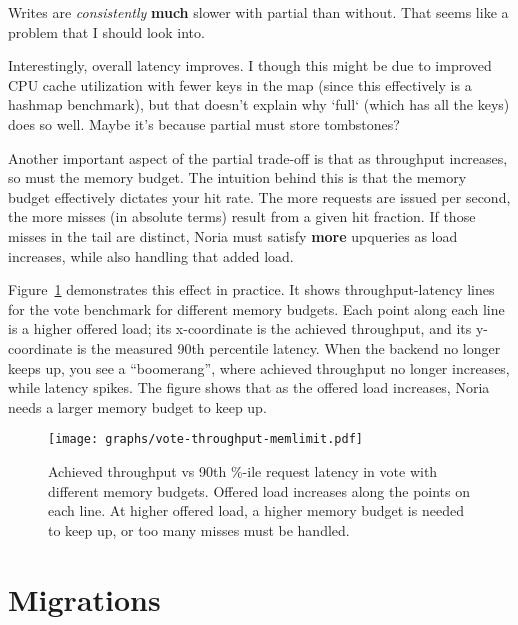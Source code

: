 \begin{inprogress}
  Writes are \textit{consistently} \textbf{much} slower with partial than
  without. That seems like a problem that I should look into.
\end{inprogress}

\begin{inprogress}
  Interestingly, overall latency improves. I though this might be due to
  improved CPU cache utilization with fewer keys in the map (since this
  effectively is a hashmap benchmark), but that doesn't explain why `full`
  (which has all the keys) does so well. Maybe it's because partial must store
  tombstones?
\end{inprogress}

Another important aspect of the partial trade-off is that as throughput
increases, so must the memory budget. The intuition behind this is that the
memory budget effectively dictates your hit rate. The more requests are issued
per second, the more misses (in absolute terms) result from a given hit
fraction. If those misses in the tail are distinct, Noria must satisfy
\textbf{more} upqueries as load increases, while also handling that added load.

Figure~\ref{f:vote-throughput-memlimit} demonstrates this effect in practice. It
shows throughput-latency lines for the vote benchmark for different memory
budgets. Each point along each line is a higher offered load; its x-coordinate
is the achieved throughput, and its y-coordinate is the measured 90th percentile
latency. When the backend no longer keeps up, you see a ``boomerang'', where
achieved throughput no longer increases, while latency spikes. The figure shows
that as the offered load increases, Noria needs a larger memory budget to keep
up.

\begin{figure}[ht]
  \centering
  \texttt{[image: graphs/vote-throughput-memlimit.pdf]}
  \caption{Achieved throughput vs 90th \%-ile request latency in vote with
  different memory budgets. Offered load increases along the points on each
  line. At higher offered load, a higher memory budget is needed to keep up, or
  too many misses must be handled.}
  \label{f:vote-throughput-memlimit}
\end{figure}

\section{Migrations}
\label{s:eval:cost:mig}

